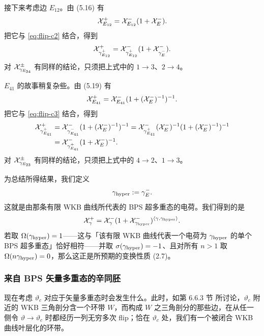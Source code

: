 接下来考虑边 $E_{12}$。由 (5.16)%
有
\begin{equation}
\mathcal{X}^+_{E_{12}} = \mathcal{X}^-_{E_{12}} (1 + \mathcal{X}^-_E).
\end{equation}
把它与 \eqref{eq:flip-c2} 结合，得到
\begin{equation}
\mathcal{X}^+_{\gamma^+_{E_{12}}} = \mathcal{X}^-_{\gamma^+_{E_{12}}} (1 + \mathcal{X}^-_{\gamma^-_E}).
\end{equation}
对 $\mathcal{X}^\pm_{\gamma_{E_{34}}}$ 有同样的结论，只须把上式中的 $1\to3$、$2\to4$。

$E_{41}$ 的故事稍复杂些。由 (5.19)%
有
\begin{equation}
\mathcal{X}^+_{E_{41}} = \mathcal{X}^-_{E_{41}} (1 + (\mathcal{X}^-_E)^{-1})^{-1}.
\end{equation}
把它与 \eqref{eq:flip-c3} 结合，得到
\begin{equation}
\begin{split}
\mathcal{X}^+_{\gamma^+_{E_{41}}} &= \mathcal{X}^-_{\gamma^-_{E_{41}}} (1 + (\mathcal{X}^-_E)^{-1})^{-1}
= \mathcal{X}^-_{\gamma^+_{E_{41}}} (\mathcal{X}^-_E)^{-1} (1 + (\mathcal{X}^-_E)^{-1})^{-1} \\
&= \mathcal{X}^-_{\gamma^+_{E_{41}}} (1 + \mathcal{X}^-_E)^{-1}.
\end{split}
\end{equation}
对 $\mathcal{X}^\pm_{\gamma_{E_{23}}}$ 有同样的结论，只须把上式中的 $4\to2$、$1\to3$。

为总结所得结果，我们定义
\begin{equation}
\gamma_{\rm hyper} := \gamma^-_E.
\end{equation}
这就是由那条有限 WKB 曲线所代表的 BPS 超多重态的电荷。我们得到的是
\begin{equation} \label{eq:KS-flip}
\mathcal{X}^+_\gamma = \mathcal{X}^-_\gamma (1 + \mathcal{X}^-_{\gamma_{\rm hyper}})^{\langle \gamma, \gamma_{\rm hyper} \rangle}.
\end{equation}
若取 $\Omega(\gamma_{\rm hyper})=1$——这与「该有限 WKB 曲线代表一个电荷为 $\gamma_{\rm hyper}$ 的单个 BPS 超多重态」恰好相符——并取 $\sigma(\gamma_{\rm hyper})=-1$、且对所有 $n>1$ 取 $\Omega(n\gamma_{\rm hyper})=0$，那么这正是所预期的变换性质 (2.7)。%

\subsubsection{来自 BPS 矢量多重态的辛同胚}

现在考虑 $\vartheta_c$ 对应于矢量多重态时会发生什么。此时，如第 6.6.3 节%
所讨论，$\vartheta_c$ 附近的 WKB 三角剖分含一个环带 $W$，而构成 $W$ 之三角剖分的那些边，在从任一侧令 $\vartheta\to\vartheta_c$ 时都经历一列无穷多次 flip；恰在 $\vartheta_c$ 处，我们有一个被闭合 WKB 曲线叶层化的环带。

